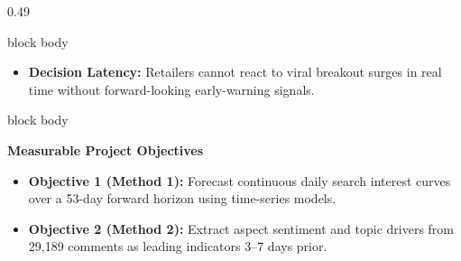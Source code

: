 \documentclass[aspectratio=169, 10pt]{beamer}
\newenvironment{card}[1][]{%
        \begin{beamercolorbox}[rounded=true,shadow=false,wd=\linewidth,sep=3.5pt,#1]{block body}%
        \fontsize{7.8pt}{9.8pt}\selectfont%
    }{%
        \end{beamercolorbox}%
    }
\begin{document}
\begin{frame}[t]
\begin{columns}[T]
\begin{column}{0.49\textwidth}
\begin{card}
\begin{itemize}
                        \item \textbf{Decision Latency:} Retailers cannot react to viral breakout surges in real time without forward-looking early-warning signals.                                   
                    \end{itemize}                                                                                                                                                                      
                \end{card}                                                                                                                                                                             
                \vspace{0.14cm}                                                                                                                                                                        
                \begin{card}                                                                                                                                                                           
                    \textbf{\color{BlueAccent}Measurable Project Objectives}\\[0.03cm]                                                                                                                 
                    \begin{itemize}\setlength{\itemsep}{1.2pt}                                                                                                                                         
                        \item \textbf{Objective 1 (Method 1):} Forecast continuous daily search interest curves over a 53-day forward horizon using time-series models.                                
                        \item \textbf{Objective 2 (Method 2):} Extract aspect sentiment and topic drivers from 29,189 comments as leading indicators 3--7 days prior.                                  
                    \end{itemize}                                                                                                                                                                      
                \end{card}                                                                                                                                                                             
            \end{column}                                                                                                                                                                               
                                                                                                                                                                                                       

\end{columns}
\end{frame}
\end{document}
